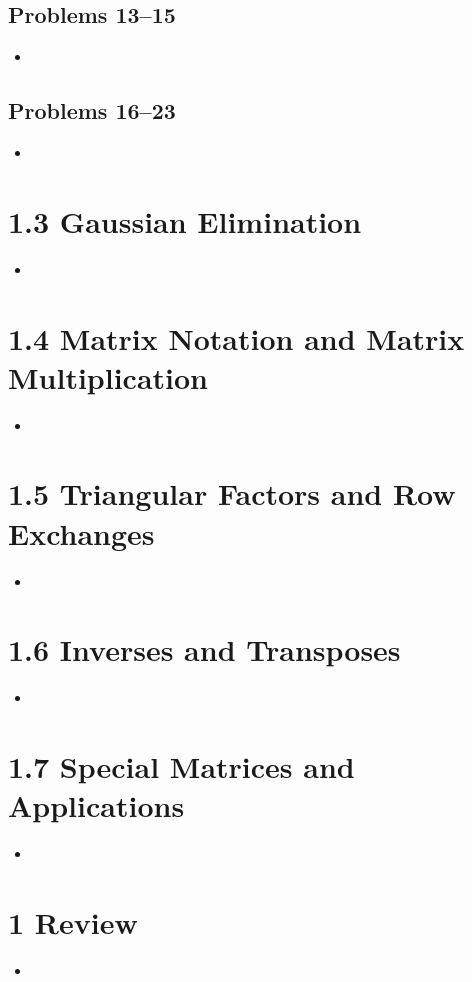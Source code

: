 \begin{itemize}
  \subsection{Problems 13--15}
  \begin{itemize}
    \item
  \end{itemize}

  \subsection{Problems 16--23}
  \begin{itemize}
    \item
  \end{itemize}

\end{itemize}

\section{1.3 Gaussian Elimination}
\begin{itemize}
  \item []

\end{itemize}

\section{1.4 Matrix Notation and Matrix Multiplication}
\begin{itemize}
  \item []

\end{itemize}

\section{1.5 Triangular Factors and Row Exchanges}
\begin{itemize}
  \item []

\end{itemize}

\section{1.6 Inverses and Transposes}
\begin{itemize}
  \item []

\end{itemize}

\section{1.7 Special Matrices and Applications}
\begin{itemize}
  \item []


\end{itemize}

\section{1 Review}
\begin{itemize}
  \item []


\end{itemize}


